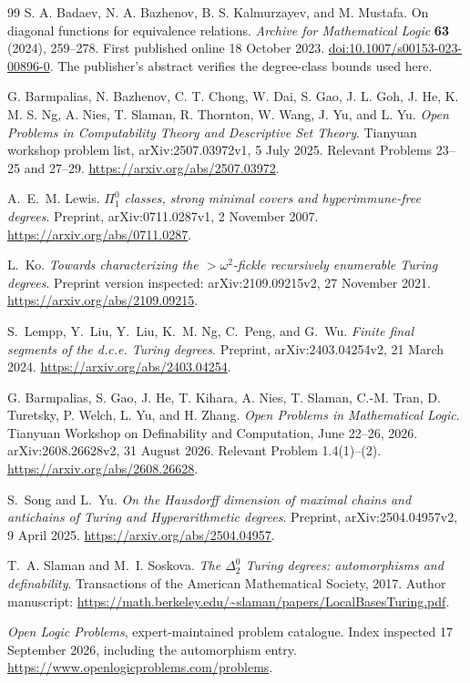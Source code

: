 \documentclass[11pt,a4paper]{article}
\theoremstyle{definition}\newtheorem{definition}[theorem]{Definition}
\theoremstyle{remark}\newtheorem{remark}[theorem]{Remark}
\begin{document}
\begin{thebibliography}{99}
S. A. Badaev, N. A. Bazhenov, B. S. Kalmurzayev, and M. Mustafa.
On diagonal functions for equivalence relations.
\emph{Archive for Mathematical Logic} \textbf{63} (2024), 259--278.
First published online 18 October 2023.
\href{https://doi.org/10.1007/s00153-023-00896-0}{doi:10.1007/s00153-023-00896-0}.
The publisher's abstract verifies the degree-class bounds used here.

G. Barmpalias, N. Bazhenov, C. T. Chong, W. Dai, S. Gao, J. L. Goh, J. He,
K. M. S. Ng, A. Nies, T. Slaman, R. Thornton, W. Wang, J. Yu, and L. Yu.
\emph{Open Problems in Computability Theory and Descriptive Set Theory}.
Tianyuan workshop problem list, arXiv:2507.03972v1, 5 July 2025.
Relevant Problems 23--25 and 27--29.
\url{https://arxiv.org/abs/2507.03972}.

A.~E.~M. Lewis.
\emph{$\Pi^0_1$ classes, strong minimal covers and hyperimmune-free degrees}.
Preprint, arXiv:0711.0287v1, 2 November 2007.
\url{https://arxiv.org/abs/0711.0287}.

L.~Ko.
\emph{Towards characterizing the $>\omega^2$-fickle recursively enumerable Turing degrees}.
Preprint version inspected: arXiv:2109.09215v2, 27 November 2021.
\url{https://arxiv.org/abs/2109.09215}.

S.~Lempp, Y.~Liu, Y.~Liu, K.~M. Ng, C.~Peng, and G.~Wu.
\emph{Finite final segments of the d.c.e. Turing degrees}.
Preprint, arXiv:2403.04254v2, 21 March 2024.
\url{https://arxiv.org/abs/2403.04254}.

G. Barmpalias, S. Gao, J. He, T. Kihara, A. Nies, T. Slaman, C.-M. Tran,
D. Turetsky, P. Welch, L. Yu, and H. Zhang.
\emph{Open Problems in Mathematical Logic}.
Tianyuan Workshop on Definability and Computation, June 22--26, 2026.
arXiv:2608.26628v2, 31 August 2026. Relevant Problem 1.4(1)--(2).
\url{https://arxiv.org/abs/2608.26628}.

S.~Song and L.~Yu.
\emph{On the Hausdorff dimension of maximal chains and antichains of Turing and Hyperarithmetic degrees}.
Preprint, arXiv:2504.04957v2, 9 April 2025.
\url{https://arxiv.org/abs/2504.04957}.

T.~A. Slaman and M.~I. Soskova.
\emph{The $\Delta^0_2$ Turing degrees: automorphisms and definability}.
Transactions of the American Mathematical Society, 2017.
Author manuscript:
\url{https://math.berkeley.edu/~slaman/papers/LocalBasesTuring.pdf}.

\emph{Open Logic Problems}, expert-maintained problem catalogue.
Index inspected 17 September 2026, including the automorphism entry.
\url{https://www.openlogicproblems.com/problems}.


\end{thebibliography}
\end{document}
